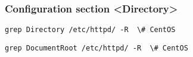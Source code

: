 \begin{frame}[fragile]
        \frametitle{Configuration section <Directory>}

 


\verb|grep Directory /etc/httpd/ -R  \# CentOS|

\verb|grep DocumentRoot /etc/httpd/ -R  \# CentOS|

\end{frame}
